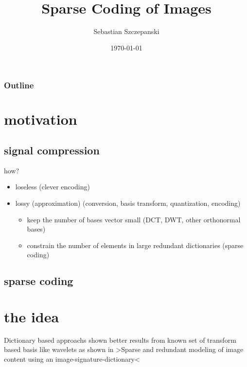 




\title{Sparse Coding of Images}
\author{Sebastian Szczepanski}
\date{\today}

\begin{frame}
\titlepage
\end{frame}

\begin{frame}
\frametitle{Outline}
\tableofcontents %
\end{frame}


\section{motivation}
\subsection{signal compression}
\begin{frame}
how? 

\begin{itemize}
\item loseless (clever encoding) 
\item lossy (approximation) (conversion, basis transform, quantization, encoding) \
\pause
	\begin{itemize}
	\item  keep the number of bases vector small (DCT, DWT, other orthonormal bases)	
	\pause
	\item constrain the number of elements in large redundant dictionaries (sparse coding)
	\end{itemize}
\end{itemize}
\end{frame}

\subsection{sparse coding}



\section{the idea}
\begin{frame}

Dictionary based approachs shown better results from known set of transform based basis like wavelets
as shown in >Sparse and redundant modeling of image content using an image-signature-dictionary<
\end{frame}

